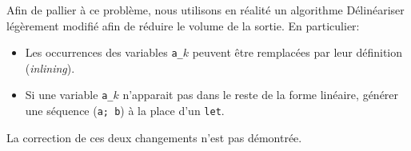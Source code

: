 Afin de pallier à ce problème, nous utilisons en réalité un algorithme
Délinéariser légèrement modifié afin de réduire le volume de la sortie. En
particulier:
\begin{itemize}
    \item Les occurrences des variables \texttt{a\_}$k$ peuvent être remplacées
          par leur définition (\textit{inlining}).
    \item Si une variable \texttt{a\_}$k$ n'apparait pas dans le reste de la
          forme linéaire, générer une séquence (\texttt{a; b}) à la place d'un
          \texttt{let}.
\end{itemize}
La correction de ces deux changements n'est pas démontrée.
